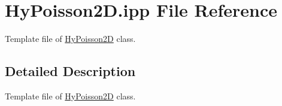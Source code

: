 \hypertarget{HyPoisson2D_8ipp}{
\section{HyPoisson2D.ipp File Reference}
\label{HyPoisson2D_8ipp}
}


Template file of \hyperlink{classHyPoisson2D}{HyPoisson2D} class.  




\subsection{Detailed Description}
Template file of \hyperlink{classHyPoisson2D}{HyPoisson2D} class. 